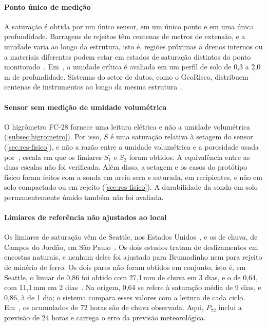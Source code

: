 \paragraph*{Ponto único de medição}

A saturação é obtida por um único sensor, em um único ponto e em uma
única profundidade. Barragens de rejeitos têm centenas de metros de
extensão, e a umidade varia ao longo da estrutura, isto é, regiões próximas a
drenos internos ou a materiais diferentes podem estar em estados de
saturação distintos do ponto monitorado~\cite{machado2007}.
Em~, a umidade
crítica é avaliada em um perfil de solo de 0,3 a 2,0\,m de
profundidade. Sistemas do setor de dutos, como o GeoRisco, distribuem
centenas de instrumentos ao longo da mesma estrutura~\cite{rocha2004georisco}.

\paragraph*{Sensor sem medição de umidade volumétrica}

O higrômetro FC-28 fornece uma leitura elétrica e não a umidade
volumétrica (\autoref{subsec:higrometro}). Por isso, $S$ é uma saturação
relativa à setagem do sensor (\autoref{sec:res-fisico}), e não a razão entre a umidade
volumétrica e a porosidade usada por~, escala em que os limiares $S_1$
e $S_2$ foram obtidos.
A equivalência entre as duas escalas não foi verificada. Além disso, a
setagem e os casos do protótipo físico foram feitos com a sonda em
areia seca e saturada, em recipientes, e não em solo compactado ou em
rejeito
(\autoref{sec:res-fisico}). A durabilidade da sonda em solo
permanentemente úmido também não foi avaliada.

\paragraph*{Limiares de referência não ajustados ao local}

Os limiares de saturação vêm de Seattle, nos Estados Unidos~\cite[p.~9, Tabela~1]{mirus2018developing}, e os de chuva, de Campos do
Jordão, em São Paulo~\cite[p.~74, Tabela~3]{mendes2020proposicao}. Os
dois estudos tratam de deslizamentos em encostas naturais, e nenhum
deles foi ajustado para Brumadinho nem para rejeito de minério de
ferro.
Os dois pares não foram obtidos em conjunto, isto é, em Seattle, o limiar de
0,86 foi obtido com 27,1\,mm de chuva em 3 dias, e o de 0,64, com
11,1\,mm em 2 dias~\cite[p.~9, Tabela~1]{mirus2018developing}.
Na origem, 0,64 se refere à saturação média de 9 dias, e 0,86, à de 1
dia; o sistema compara esses valores com a leitura de cada ciclo.
Em~, os acumulados de 72 horas são de
chuva observada. Aqui, $P_{72}$ inclui a previsão de 24 horas e carrega o
erro da previsão meteorológica.

